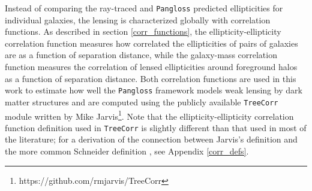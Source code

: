 \documentclass[%
 reprint,
 amsmath,amssymb,
 aps,nofootinbib
]{revtex4-1}
\begin{document}
Instead of comparing the ray-traced and \texttt{Pangloss} predicted ellipticities for individual galaxies, the lensing is characterized globally with correlation functions. As described in section \ref{corr_functions}, the ellipticity-ellipticity correlation function measures how correlated the ellipticities of pairs of galaxies are as a function of separation distance, while the galaxy-mass correlation function measures the correlation of lensed ellipticities around foreground halos as a function of separation distance. Both correlation functions are used in this work to estimate how well the \texttt{Pangloss} framework models weak lensing by dark matter structures and are computed using the publicly available \texttt{TreeCorr} module written by Mike Jarvis\footnote{https://github.com/rmjarvis/TreeCorr}. Note that the ellipticity-ellipticity correlation function definition used in \texttt{TreeCorr} is slightly different than that used in most of the literature; for a derivation of the connection between Jarvis's definition and the more common Schneider definition \cite{schneider}, see Appendix \ref{corr_defs}.



\end{document}
